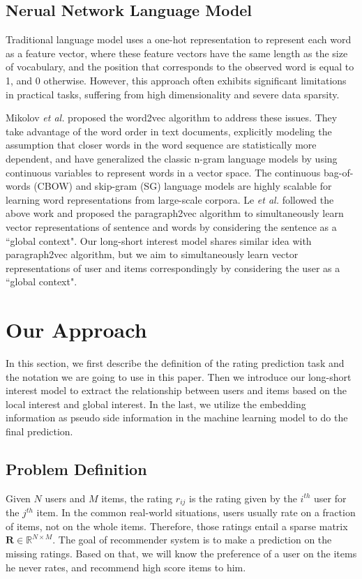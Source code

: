 \documentclass{sig-alternate-05-2015}
\begin{document}
\subsection{Nerual Network Language Model}
Traditional language model uses a one-hot representation to represent each word
as a feature vector, where these feature vectors have the same length as the size
of vocabulary, and the position that corresponds to the observed word is equal to 1,
and 0 otherwise. However, this approach often exhibits significant limitations
in practical tasks, suffering from high dimensionality and severe data sparsity.

Mikolov \textit{et al.} \cite{mikolov2013efficient, mikolov2013distributed} proposed
the word2vec algorithm to address these issues. They take advantage of the word order
in text documents, explicitly modeling the assumption that closer words in the word
sequence are statistically more dependent, and have generalized the classic n-gram
language models by using continuous variables to represent words in a vector space.
The continuous bag-of-words (CBOW) and skip-gram (SG) language models are highly
scalable for learning word representations from large-scale corpora.
Le \textit{et al.} \cite{le2014distributed} followed the above work and proposed
the paragraph2vec algorithm to simultaneously learn vector representations of sentence
and words by considering the sentence as a ``global context".
Our long-short interest model shares similar idea with paragraph2vec algorithm,
but we aim to simultaneously learn vector representations of user and items
correspondingly by considering the user as a ``global context".

\section{Our Approach}
In this section,
we first describe the definition of the rating prediction task and
the notation we are going to use in this paper.
Then we introduce our long-short interest model to extract the relationship
between users and items based on the local interest and global interest.
In the last, we utilize the embedding information as pseudo side information
in the machine learning model to do the final prediction.

\subsection{Problem Definition}
Given $N$ users and $M$ items, the rating $r_{ij}$ is the rating given by
the $i^{th}$ user for the $j^{th}$ item.
In the common real-world situations,
users usually rate on a fraction of items, not on the whole items.
Therefore,
those ratings entail a sparse matrix $\mathbf{R} \in \mathbb{R}^{N \times M}$.
The goal of recommender system is to make a prediction on the missing ratings.
Based on that, we will know the preference of a user on the items he never rates,
and recommend high score items to him.
\end{document}
